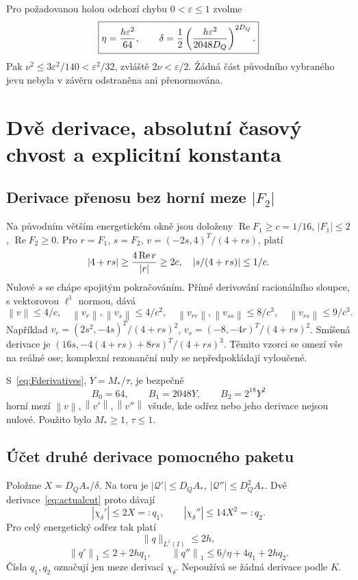 \documentclass[11pt,a4paper]{article}
\newcommand{\norm}[1]{\left\lVert#1\right\rVert}
\newcommand{\Rea}{\operatorname{Re}}
\theoremstyle{remark}\newtheorem{remark}[theorem]{Poznámka}
\numberwithin{equation}{section}
\begin{document}
Pro požadovanou holou odchozí chybu \(0<\varepsilon\le1\) zvolme
\begin{equation}
\boxed{\eta={h\varepsilon^2\over64},\qquad
\delta={1\over2}\left({h\varepsilon^2\over2048D_Q}\right)^{2D_Q}.}
\label{eq:eta-delta}
\end{equation}
Pak \(\nu^2\le3\varepsilon^2/140<\varepsilon^2/32\), zvláště \(2\nu<\varepsilon/2\). Žádná část původního vybraného jevu nebyla v závěru odstraněna ani přenormována.

\section{Dvě derivace, absolutní časový chvost a explicitní konstanta}
\label{sec:timeconstant}

\subsection{Derivace přenosu bez horní meze \texorpdfstring{$|F_2|$}{F2}}

Na původním větším energetickém okně jsou doloženy
\(\Rea F_1\ge c=1/16\), \(|F_1|\le2\), \(\Rea F_2\ge0\).
Pro \(r=F_1\), \(s=F_2\), \(v=(-2s,4)^T/(4+rs)\), platí
\[
|4+rs|\ge{4\Rea r\over|r|}\ge2c,
\quad |s/(4+rs)|\le1/c.
\]
Nulové \(s\) se chápe spojitým pokračováním. Přímé derivování racionálního sloupce, s vektorovou \(\ell^1\) normou, dává
\[
\norm v\le4/c,\quad
\norm{v_r},\norm{v_s}\le4/c^2,\quad
\norm{v_{rr}},\norm{v_{ss}}\le8/c^3,\quad
\norm{v_{rs}}\le9/c^3.
\]
Například \(v_r=(2s^2,-4s)^T/(4+rs)^2\),
\(v_s=(-8,-4r)^T/(4+rs)^2\). Smíšená derivace je
\((16s,-4(4+rs)+8rs)^T/(4+rs)^3\). Těmito vzorci se omezí vše na reálné ose; komplexní rezonanční nuly se nepředpokládají vyloučené.

S~\eqref{eq:Fderivatives}, \(Y=M_*/\tau\), je bezpečně
\begin{equation}
B_0=64,\qquad B_1=2048Y,\qquad B_2=2^{18}Y^2
\label{eq:transferbounds}
\end{equation}
horní mezí \(\norm v,\norm{v'},\norm{v''}\) všude, kde odřez nebo jeho derivace nejsou nulové. Použito bylo \(M_*\ge1\), \(\tau\le1\).

\subsection{Účet druhé derivace pomocného paketu}

Položme \(X=D_QA_*/\delta\). Na toru je
\(|\mathscr Q'|\le D_QA_*\), \(|\mathscr Q''|\le D_Q^2A_*\). Dvě derivace~\eqref{eq:actualcut} proto dávají
\[
|\chi_\delta'|\le2X=:q_1,\qquad
|\chi_\delta''|\le14X^2=:q_2.
\]
Pro celý energetický odřez tak platí
\[
\|q\|_{L^1(I)}\le2h,
\]
\[
\norm{q'}_1\le2+2hq_1,\qquad
\norm{q''}_1\le6/\eta+4q_1+2hq_2.
\]
Čísla \(q_1,q_2\) označují jen meze derivací \(\chi_\delta\). Nepoužívá se žádná derivace podle \(K\).
\end{document}
